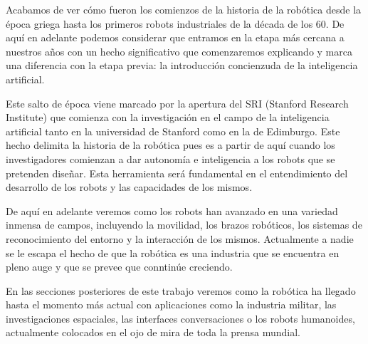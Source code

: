 Acabamos de ver cómo fueron los comienzos de la historia de la robótica desde la época griega hasta los primeros robots industriales de la década de los 60. De aquí en adelante podemos considerar que entramos en la etapa más cercana a nuestros años con un hecho significativo que comenzaremos explicando y marca una diferencia con la etapa previa: la introducción concienzuda de la inteligencia artificial.

Este salto de época viene marcado por la apertura del SRI (Stanford Research Institute) que comienza con la investigación en el campo de la inteligencia artificial tanto en la universidad de Stanford como en la de Edimburgo. Este hecho delimita la historia de la robótica pues es a partir de aquí cuando los investigadores comienzan a dar autonomía e inteligencia a los robots que se pretenden diseñar. Esta herramienta será fundamental en el entendimiento del desarrollo de los robots y las capacidades de los mismos.

De aquí en adelante veremos como los robots han avanzado en una variedad inmensa de campos, incluyendo la movilidad, los brazos robóticos, los sistemas de reconocimiento del entorno y la interacción de los mismos. Actualmente a nadie se le escapa el hecho de que la robótica es una industria que se encuentra en pleno auge y que se prevee que conntinúe creciendo.

En las secciones posteriores de este trabajo veremos como la robótica ha llegado hasta el momento más actual con aplicaciones como la industria militar, las investigaciones espaciales, las interfaces conversaciones o los robots humanoides, actualmente colocados en el ojo de mira de toda la prensa mundial.
